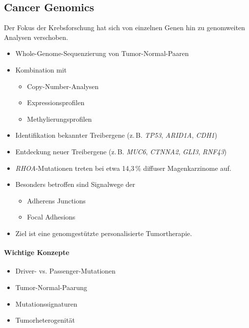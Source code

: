 

\subsection*{Cancer Genomics}\label{subsec:cancer-genomics}

Der Fokus der Krebsforschung hat sich von einzelnen Genen hin zu genomweiten Analysen verschoben.

\begin{itemize}

    \item Whole-Genome-Sequenzierung von Tumor-Normal-Paaren

    \item Kombination mit

    \begin{itemize}
        \item Copy-Number-Analysen
        \item Expressionsprofilen
        \item Methylierungsprofilen
    \end{itemize}

    \item Identifikation bekannter Treibergene
    (z.\,B. \textit{TP53}, \textit{ARID1A}, \textit{CDH1})

    \item Entdeckung neuer Treibergene
    (z.\,B. \textit{MUC6}, \textit{CTNNA2}, \textit{GLI3}, \textit{RNF43})

    \item \textit{RHOA}-Mutationen treten bei etwa
    14,3\,\% diffuser Magenkarzinome auf.

    \item Besonders betroffen sind Signalwege der

    \begin{itemize}
        \item Adherens Junctions
        \item Focal Adhesions
    \end{itemize}

    \item Ziel ist eine genomgestützte personalisierte Tumortherapie.

\end{itemize}

\paragraph{Wichtige Konzepte}

\begin{itemize}

    \item Driver- vs.
    Passenger-Mutationen

    \item Tumor-Normal-Paarung

    \item Mutationssignaturen

    \item Tumorheterogenität

\end{itemize}